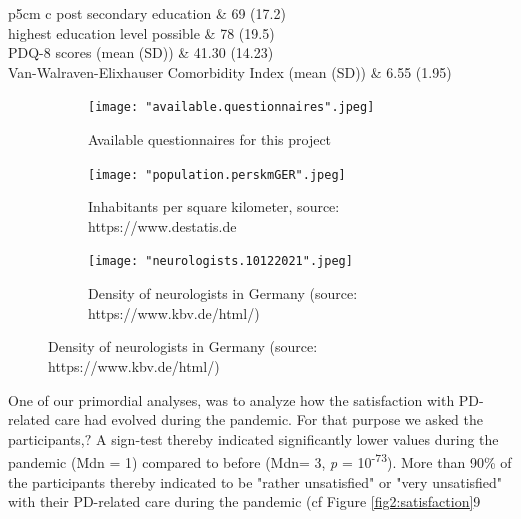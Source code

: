 \documentclass{bmcart}
\begin{document}
\begin{table}[!ht]
\begin{tabular}{p{5cm} c}
\hspace{3mm} post secondary education  										&   	69 (17.2) 		\\ \hline
\hspace{3mm} highest education level possible 										& 	78 (19.5)  		\\ \hline
\hspace{3mm} PDQ-8 scores (mean (SD)) 										& 	41.30 (14.23) 	\\ \hline
Van-Walraven-Elixhauser \newline \hspace{3mm} Comorbidity Index (mean (SD)) 	& 	6.55 (1.95) 		\\ 
\bottomrule
\caption{Demographics of subjects filling out questionnaire:}
\label{tab1:demographics}
\end{tabular}
\end{table}

\begin{figure}
    \centering
    \begin{subfigure}[b]{0.35\linewidth}
        \texttt{[image: "available.questionnaires".jpeg]}
        \caption{Available questionnaires for this project}
        \label{fig1:questionnaires}
    \end{subfigure}%
    \begin{subfigure}[b]{0.35\linewidth}
        \texttt{[image: "population.perskmGER".jpeg]}
        \caption{Inhabitants per square kilometer, source: https://www.destatis.de}
        \label{fig1:population}
    \end{subfigure}%
    \begin{subfigure}[b]{0.35\linewidth}
        \texttt{[image: "neurologists.10122021".jpeg]}
        \caption{Density of neurologists in Germany (source: https://www.kbv.de/html/)}
        \label{fig1:neurologists}
    \end{subfigure}%
\end{figure}

One of our primordial analyses, was to analyze how the satisfaction with PD-related care had evolved during the pandemic. For that purpose we asked the participants,$?$ %
A sign-test thereby indicated significantly lower values during the pandemic (Mdn = 1) compared to before (Mdn= 3, \textit{p} = 10\textsuperscript{-73}). More than 90\% of the participants thereby indicated to be "rather unsatisfied" or "very unsatisfied" with their PD-related care during the pandemic (cf Figure \ref{fig2:satisfaction}9
\end{document}
